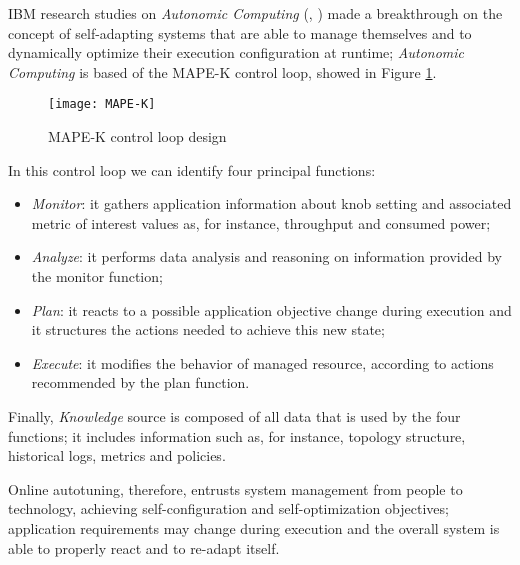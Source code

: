 IBM research studies on \textit{Autonomic Computing} (\cite{kephart2003vision}, \cite{computing2006architectural}) made a breakthrough on the concept of self-adapting systems that are able to manage themselves and to dynamically optimize their execution configuration at runtime; \textit{Autonomic Computing} is based of the MAPE-K control loop, showed in Figure \ref{fig::mape-k}.

\begin{figure}[H]

    \centering
    \texttt{[image: MAPE-K]}
    \caption{MAPE-K control loop design}
    \label{fig::mape-k}

\end{figure}

In this control loop we can identify four principal functions:

\begin{itemize}

    \item \textit{Monitor}: it gathers application information about knob setting and associated metric of interest values as, for instance, throughput and consumed power;
    
    \item \textit{Analyze}: it performs data analysis and reasoning on information provided by the monitor function;
    
    \item \textit{Plan}: it reacts to a possible application objective change during execution and it structures the actions needed to achieve this new state;
    
    \item \textit{Execute}: it modifies the behavior of managed resource, according to actions recommended by the plan function.

\end{itemize}

Finally, \textit{Knowledge} source is composed of all data that is used by the four functions; it includes information such as, for instance, topology structure, historical logs, metrics and policies.

Online autotuning, therefore, entrusts system management from people to technology, achieving self-configuration and self-op\-ti\-mi\-za\-tion objectives; application requirements may change during execution and the overall system is able to properly react and to re-adapt itself.





